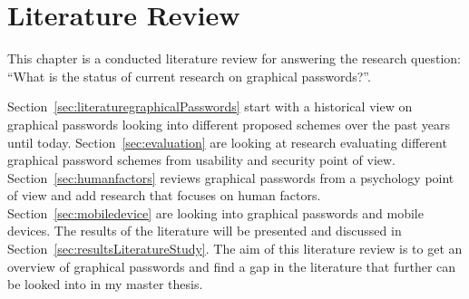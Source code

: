 \chapter{Literature Review}
    
  This chapter is a conducted literature review for answering the research question: ``What is the status of current research on graphical passwords?''.

  Section~\ref{sec:literaturegraphicalPasswords} start with a historical view on graphical passwords looking into different proposed schemes over the past years until today. Section~\ref{sec:evaluation} are looking at research evaluating different graphical password schemes from usability and security point of view. Section~\ref{sec:humanfactors} reviews graphical passwords from a psychology point of view and add research that focuses on human factors. Section~\ref{sec:mobiledevice} are looking into graphical passwords and mobile devices.
  The results of the literature will be presented and discussed in Section~\ref{sec:resultsLiteratureStudy}. The aim of this literature review is to get an overview of graphical passwords and find a gap in the literature that further can be looked into in my master thesis.
